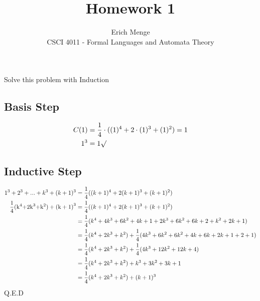 \documentclass[12pt]{article}
\newenvironment{problem}[2][Problem]{\begin{trivlist}
\item[\hskip \labelsep {\bfseries #1}\hskip \labelsep {\bfseries #2.}]}{\end{trivlist}}
\begin{document}

\title{Homework 1}%
\author{Erich Menge\\ %
CSCI 4011 - Formal Languages and Automata Theory} %

\maketitle

\begin{problem}{1}
Solve this problem with Induction \\
\subsection*{Basis Step}
\begin{align*}
{C(1)} &= \frac{1}{4} \cdot ({(1)^4} + 2 \cdot {(1)^3} + {(1)^2}) = 1\\
{1^3} &= 1\surd
\end{align*}
\subsection*{Inductive Step}
\begin{align*}
{1^3} + {2^3} + ... + {k^3} + {(k + 1)^3} &= \frac{1}{4}({(k + 1)^4} + 2{(k + 1)^3} + {(k + 1)^2})\\
\frac{1}{4}{\rm{(}}{{\rm{k}}^4}{\rm{  +  2}}{{\rm{k}}^3}{\rm{  +  }}{{\rm{k}}^2}{\rm{)  +  (k  +  1}}{{\rm{)}}^3} &= \frac{1}{4}({(k + 1)^4} + 2{(k + 1)^3} + {(k + 1)^2})\\
& = \frac{1}{4}({k^4} + 4{k^3} + 6{k^2} + 4k + 1 + 2{k^3} + 6{k^2} + 6k + 2 + {k^2} + 2k + 1)\\
& = \frac{1}{4}({k^4} + 2{k^3} + {k^2}) + \frac{1}{4}(4{k^3} + 6{k^2} + 6{k^2} + 4k + 6k + 2k + 1 + 2 + 1)\\
& = \frac{1}{4}({k^4} + 2{k^3} + {k^2}) + \frac{1}{4}(4{k^3} + 12{k^2} + 12k + 4)\\
& = \frac{1}{4}({k^4} + 2{k^3} + {k^2}) + {k^3} + 3{k^2} + 3k + 1\\
& = \frac{1}{4}({k^4} + 2{k^3} + {k^2}) + {(k + 1)^3}
\end{align*}
\hfill Q.E.D
\end{problem} \newpage
\end{document}

